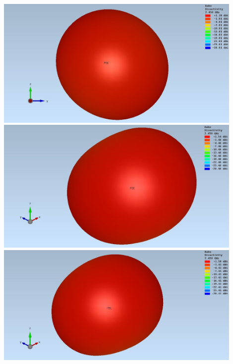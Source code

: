 {
\centering
\includegraphics[width=0.9\textwidth]{content/bilder/Evaluation/Loop/L2/ohneABS/EM_Far_Field_Loop_Lambda2_ohneABS.JPG}
\label{fig:sim_Loop_freiraum_3D}
\medskip
\includegraphics[width=0.9\textwidth]{content/bilder/Evaluation/Loop/L2/1ABS/EM_Far_Field_Loop_Lambda2_mitABS.JPG}
\label{fig:sim_Loop_freiraum_3D_1ABS}
\medskip
\includegraphics[width=0.9\textwidth]{content/bilder/Evaluation/Loop/L2/2ABS/EM_Far_Field_Loop_Lambda2_mit2ABS.JPG}
\label{fig:sim_Loop_freiraum_3D_2ABS}
}
